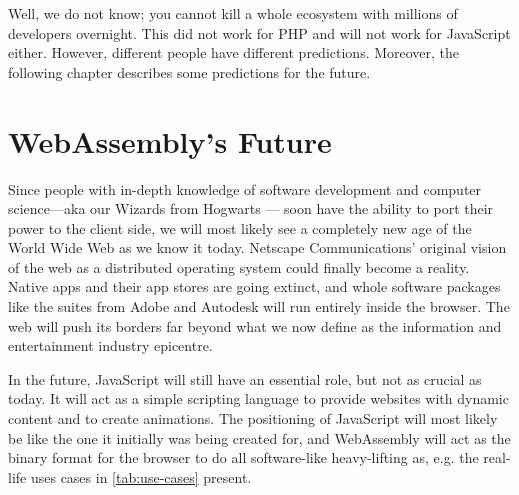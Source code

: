 \documentclass[10pt]{article}
\begin{document}
\begin{sloppypar}
  Well, we do not know; you cannot kill a whole ecosystem with millions of developers overnight. This did not work for PHP and will not work for JavaScript either. However, different people have different predictions. Moreover, the following chapter describes some predictions for the future.

  \section{WebAssembly's Future}
  \label{sec:webassembly-future}

  Since people with in-depth knowledge of software development and computer science—aka our Wizards from Hogwarts — soon have the ability to port their power to the client side, we will most likely see a completely new age of the World Wide Web as we know it today. Netscape Communications’ original vision of the web as a distributed operating system could finally become a reality. Native apps and their app stores are going extinct, and whole software packages like the suites from Adobe and Autodesk will run entirely inside the browser. The web will push its borders far beyond what we now define as the information and entertainment industry epicentre.

  In the future, JavaScript will still have an essential role, but not as crucial as today. It will act as a simple scripting language to provide websites with dynamic content and to create animations. The positioning of JavaScript will most likely be like the one it initially was being created for, and WebAssembly will act as the binary format for the browser to do all software-like heavy-lifting as, e.g. the real-life uses cases in \autoref{tab:use-cases} present.


\end{sloppypar}
\end{document}
